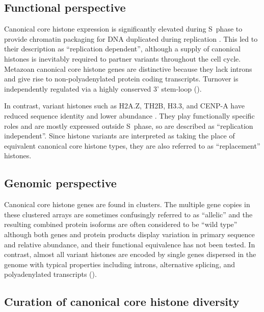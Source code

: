   \subsection{Functional perspective}

    Canonical core histone expression
    is significantly elevated during S~phase to provide chromatin packaging
    for DNA duplicated during replication \citep{WuBonner1981}.
    This led to their description as ``replication dependent'',
    although a supply of canonical histones is inevitably required
    to partner variants throughout the cell cycle.
    Metazoan canonical core histone genes are distinctive
    because they lack introns and give rise to non-polyadenylated protein coding transcripts.
    Turnover is independently regulated via a highly
    conserved 3' stem-loop ().

    In contrast, variant histones such as H2A.Z, TH2B, H3.3, and CENP-A have
    reduced sequence identity and lower abundance \citep{TalbertHenikoff2010}.
    They play functionally specific roles and are mostly expressed outside S~phase,
    so are described as ``replication independent''.
    Since histone variants are interpreted as taking the place
    of equivalent canonical core histone types,
    they are also referred to as ``replacement'' histones.

  \subsection{Genomic perspective}

    Canonical core histone genes are found in \NumberOfClusters{} clusters.
    The multiple gene copies in these clustered arrays are
    sometimes confusingly referred to as ``allelic''
    and the resulting combined protein isoforms are often considered to be ``wild type''
    although both genes and protein products display
    variation in primary sequence and relative abundance,
    and their functional equivalence has not been tested.
    In contrast, almost all variant histones are encoded by single genes dispersed in the genome
    with typical properties including introns, alternative splicing,
    and polyadenylated transcripts ().

  \subsection{Curation of canonical core histone diversity}

